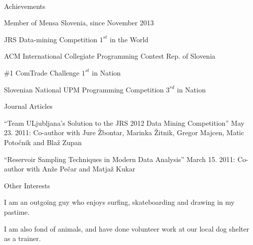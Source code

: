 \documentclass{resume} %
\begin{document}
\ \\

\begin{rSection}{}


\begin{aSubsection}{Achievements}
\item Member of Mensa Slovenia, since November 2013
\item JRS Data-mining Competition \hfill $1^{st}$ in the World
\item ACM International Collegiate Programming Contest \hfill Rep. of Slovenia
\item \#1 ComTrade Challenge \hfill $1^{st}$ in Nation
\item Slovenian National UPM Programming Competition \hfill $3^{rd}$ in Nation
\end{aSubsection}



\begin{aSubsection}{Journal Articles}
\item ``Team ULjubljana’s Solution to the JRS 2012 Data Mining Competition'' May 23. 2011: Co-author with Jure \v{Z}bontar, Marinka \v{Z}itnik, Gregor Majcen, Matic Poto\v{c}nik and Bla\v{z} Zupan
\item ``Reservoir Sampling Techniques in Modern Data Analysis'' March 15. 2011: Co-author with An\v{z}e Pe\v{c}ar and Matja\v{z} Kukar
\end{aSubsection}



\begin{aSubsection}{Other Interests}
\item I am an outgoing guy who enjoys surfing, skateboarding and drawing in my pastime. 
\item I am also fond of animals, and have done volunteer work at our local dog shelter as a trainer.
\end{aSubsection}





\end{rSection}

\end{document}
